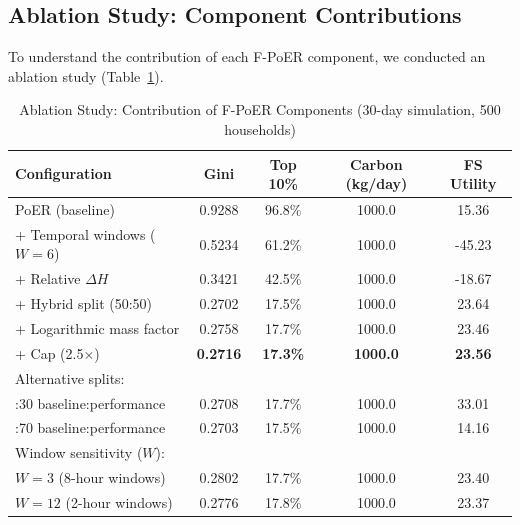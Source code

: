 \documentclass[12pt,a4paper]{article}
\begin{document}
\subsection{Ablation Study: Component Contributions}

To understand the contribution of each F-PoER component, we conducted an ablation study (Table~\ref{tab:ablation}).

\begin{table}[h]
\centering
\caption{Ablation Study: Contribution of F-PoER Components (30-day simulation, 500 households)}
\label{tab:ablation}
\begin{tabular}{lcccc}
\toprule
\textbf{Configuration} & \textbf{Gini} & \textbf{Top 10\%} & \textbf{Carbon (kg/day)} & \textbf{FS Utility} \\
\midrule
PoER (baseline) & 0.9288 & 96.8\% & 1000.0 & 15.36 \\
+ Temporal windows ($W=6$) & 0.5234 & 61.2\% & 1000.0 & -45.23 \\
+ Relative $\Delta H$ & 0.3421 & 42.5\% & 1000.0 & -18.67 \\
+ Hybrid split (50:50) & 0.2702 & 17.5\% & 1000.0 & 23.64 \\
+ Logarithmic mass factor & 0.2758 & 17.7\% & 1000.0 & 23.46 \\
+ Cap (2.5$\times$) & \textbf{0.2716} & \textbf{17.3\%} & \textbf{1000.0} & \textbf{23.56} \\
\midrule
Alternative splits: & & & & \\
\quad 70:30 baseline:performance & 0.2708 & 17.7\% & 1000.0 & 33.01 \\
\quad 30:70 baseline:performance & 0.2703 & 17.5\% & 1000.0 & 14.16 \\
\midrule
Window sensitivity ($W$): & & & & \\
\quad $W=3$ (8-hour windows) & 0.2802 & 17.7\% & 1000.0 & 23.40 \\
\quad $W=12$ (2-hour windows) & 0.2776 & 17.8\% & 1000.0 & 23.37 \\
\bottomrule
\end{tabular}
\end{table}
\end{document}
